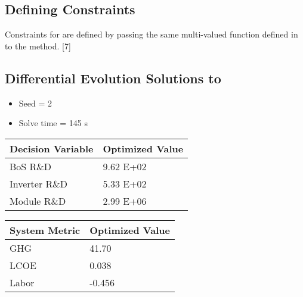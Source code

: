 \documentclass[letterpaper,10pt,english]{sphinxmanual}
\begin{document}
\subsection{Defining Constraints}
\label{\detokenize{doc-src/optimizers:defining-constraints-2}}\label{\detokenize{doc-src/optimizers:defining-constraints-1}}
Constraints for  are defined by passing the
same multi-valued function defined in  to the
 method. {[}7{]}


\subsection{Differential Evolution Solutions to }
\label{\detokenize{doc-src/optimizers:differential-evolution-solutions-to-pv-residential-simple}}
\begin{itemize}
\item {} 
Seed = 2

\item {} 
Solve time = 145 s

\end{itemize}


\begin{savenotes}\sphinxattablestart
\centering
\begin{tabulary}{\linewidth}[t]{|T|T|}
\hline
\sphinxstyletheadfamily 
Decision Variable
&\sphinxstyletheadfamily 
Optimized Value
\\
\hline
BoS R\&D
&
9.62 E+02
\\
\hline
Inverter R\&D
&
5.33 E+02
\\
\hline
Module R\&D
&
2.99 E+06
\\
\hline
\end{tabulary}
\par
\sphinxattableend\end{savenotes}


\begin{savenotes}\sphinxattablestart
\centering
\begin{tabulary}{\linewidth}[t]{|T|T|}
\hline
\sphinxstyletheadfamily 
System Metric
&\sphinxstyletheadfamily 
Optimized Value
\\
\hline
GHG
&
41.70
\\
\hline
LCOE
&
0.038
\\
\hline
Labor
&
-0.456
\\
\hline
\end{tabulary}
\par
\sphinxattableend\end{savenotes}
\end{document}
